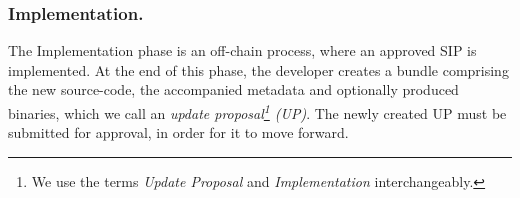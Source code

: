 

\subsubsection{Implementation.}

The Implementation phase is an off-chain process, where an approved SIP is
implemented.
At the end of this phase, the developer creates a bundle comprising the new
source-code, the accompanied metadata and optionally produced binaries, which
we call an \emph{update proposal\footnote{We use the terms \emph{Update
Proposal} and \emph{Implementation} interchangeably.} (UP)}. The newly created
UP must be submitted for approval, in order for it to move forward.

